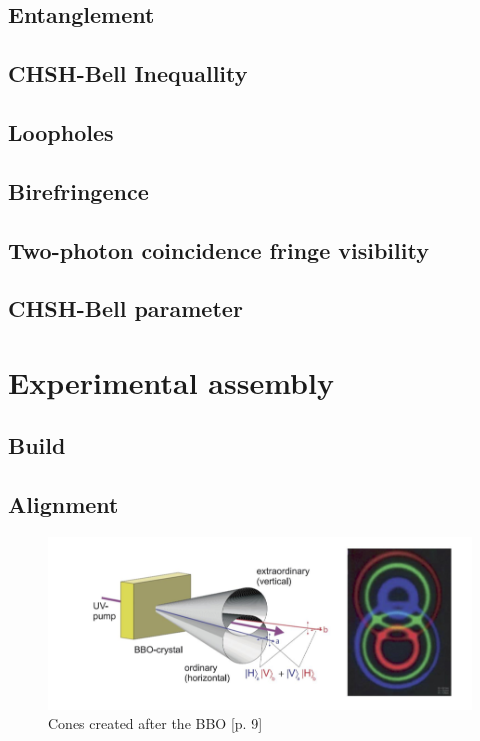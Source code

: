 \documentclass[12pt,a4paper]{article}
\begin{document}
\begin{multicols}{2}
\subsection{Entanglement}

\subsection{CHSH-Bell Inequallity}

\subsection{Loopholes}

\subsection{Birefringence}

\subsection{Two-photon coincidence fringe visibility}

\subsection{CHSH-Bell parameter}

\section{Experimental assembly}

\subsection{Build}

\subsection{Alignment}

\begin{figure}[H]
 \centering
 \includegraphics[scale=0.7]{./figures/cones.png}
 \caption{Cones created after the BBO \cite{physikwiki}[p. 9]}
 \label{fig:cones}
\end{figure}


\end{multicols}
\end{document}
